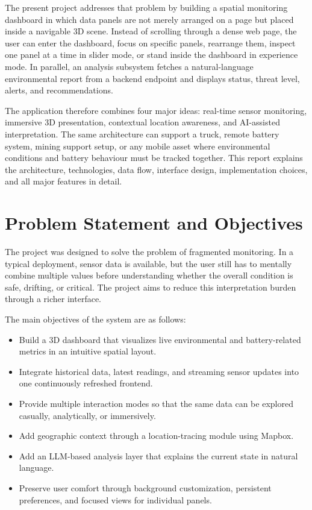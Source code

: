 \documentclass[conference]{IEEEtran}
\begin{document}
The present project addresses that problem by building a spatial monitoring dashboard in which data panels are not merely arranged on a page but placed inside a navigable 3D scene. Instead of scrolling through a dense web page, the user can enter the dashboard, focus on specific panels, rearrange them, inspect one panel at a time in slider mode, or stand inside the dashboard in experience mode. In parallel, an analysis subsystem fetches a natural-language environmental report from a backend endpoint and displays status, threat level, alerts, and recommendations.

The application therefore combines four major ideas: real-time sensor monitoring, immersive 3D presentation, contextual location awareness, and AI-assisted interpretation. The same architecture can support a truck, remote battery system, mining support setup, or any mobile asset where environmental conditions and battery behaviour must be tracked together. This report explains the architecture, technologies, data flow, interface design, implementation choices, and all major features in detail.

\section{Problem Statement and Objectives}
The project was designed to solve the problem of fragmented monitoring. In a typical deployment, sensor data is available, but the user still has to mentally combine multiple values before understanding whether the overall condition is safe, drifting, or critical. The project aims to reduce this interpretation burden through a richer interface.

The main objectives of the system are as follows:
\begin{itemize}
\item Build a 3D dashboard that visualizes live environmental and battery-related metrics in an intuitive spatial layout.
\item Integrate historical data, latest readings, and streaming sensor updates into one continuously refreshed frontend.
\item Provide multiple interaction modes so that the same data can be explored casually, analytically, or immersively.
\item Add geographic context through a location-tracing module using Mapbox.
\item Add an LLM-based analysis layer that explains the current state in natural language.
\item Preserve user comfort through background customization, persistent preferences, and focused views for individual panels.
\end{itemize}
\end{document}
